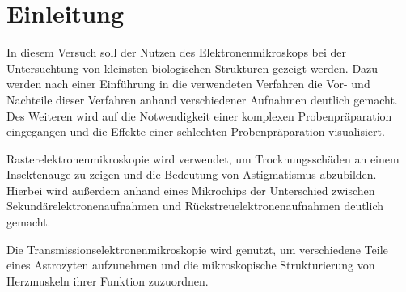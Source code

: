 \section{Einleitung}

  In diesem Versuch soll der Nutzen des Elektronenmikroskops bei der Untersuchtung von kleinsten biologischen Strukturen gezeigt werden.
  Dazu werden nach einer Einführung in die verwendeten Verfahren die Vor- und Nachteile dieser Verfahren anhand verschiedener Aufnahmen deutlich gemacht.
  Des Weiteren wird auf die Notwendigkeit einer komplexen Probenpräparation eingegangen und die Effekte einer schlechten Probenpräparation visualisiert.

  Rasterelektronenmikroskopie wird verwendet, um Trocknungsschäden an einem Insektenauge zu zeigen und die Bedeutung von Astigmatismus abzubilden.
  Hierbei wird außerdem anhand eines Mikrochips der Unterschied zwischen Sekundärelektronenaufnahmen und Rückstreuelektronenaufnahmen deutlich gemacht.

  Die Transmissionselektronenmikroskopie wird genutzt, um verschiedene Teile eines Astrozyten aufzunehmen und die mikroskopische Strukturierung von Herzmuskeln ihrer Funktion zuzuordnen.
